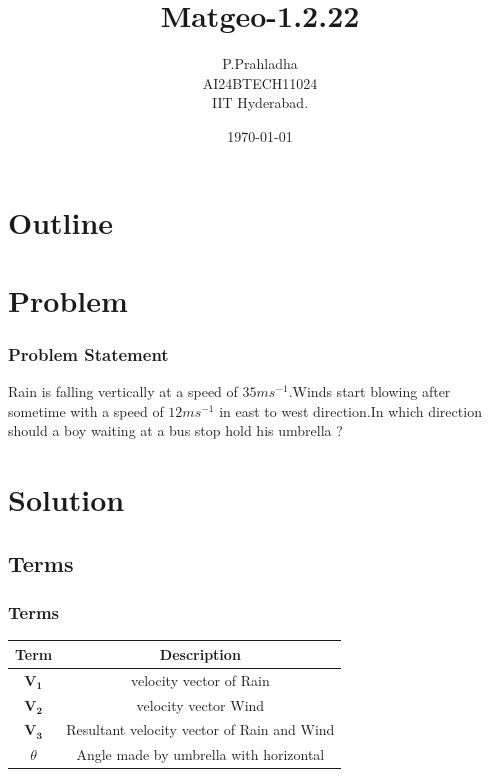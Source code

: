 \documentclass{beamer}
\title{Matgeo-1.2.22}
\author{P.Prahladha \\ AI24BTECH11024\\ IIT Hyderabad.}
\date{\today}
\theoremstyle{remark}
\let\vec\mathbf
\numberwithin{equation}{section}
\begin{document}
\begin{frame}
\titlepage
\end{frame}

\section*{Outline}
\begin{frame}
\tableofcontents
\end{frame}
\section{Problem}
\begin{frame}
\frametitle{Problem Statement}
Rain is falling vertically at a speed of $35ms^{-1}$.Winds start blowing after sometime with a speed of $12ms^{-1}$ in east to west direction.In which direction should a boy waiting at a bus stop hold his umbrella ?
\end{frame}

\section{Solution}
\subsection{Terms}
\begin{frame}
\frametitle{Terms}
\begin{tabular}[12ptx]{ |c| c|}
\hline\textbf{Term} & \textbf{Description}\\
\hline
$\vec{V_{1}}$ & velocity vector of Rain\\
\hline
$\vec{V_{2}}$ & velocity vector Wind\\
\hline
$\vec{V_{3}}$ & Resultant velocity vector of Rain and Wind\\
\hline
$\theta$ & Angle made by umbrella with horizontal\\
\hline
\end{tabular}
\end{frame}
\end{document}
